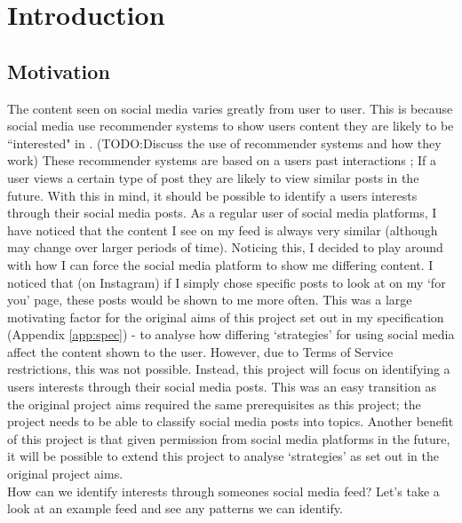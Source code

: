 \chapter{Introduction}
\label{ch:introduction}

\section{Motivation}

The content seen on social media varies greatly from user to user. This is because social media use recommender systems to
show users content they are likely to be ``interested" in \cite{}. (TODO:Discuss the use of recommender systems and how they work)
These recommender systems are based on a users past interactions \cite{};
If a user views a certain type of post they are likely to view similar posts in the future. With this in mind, it should be possible
to identify a users interests through their social media posts. As a regular user of social media platforms, I have noticed that
the content I see on my feed is always very similar (although may change over larger periods of time). Noticing this, I decided to
play around with how I can force the social media platform to show me differing content. I noticed that (on Instagram) if I simply
chose specific posts to look at on my `for you' page, these posts would be shown to me more often. This was a large motivating factor
for the original aims of this project set out in my specification (Appendix \ref{app:spec}) - to analyse how differing
`strategies' for using social media affect the content shown to the user. However, due to Terms of Service restrictions, this was not
possible. Instead, this project will focus on identifying a users interests through their social media posts. This was an easy transition
as the original project aims required the same prerequisites as this project; the project needs to be able to classify social media posts
into topics. Another benefit of this project is that given permission from social media platforms in the future, it will be possible to
extend this project to analyse `strategies' as set out in the original project aims.\\
How can we identify interests through someones social media feed? Let's take a look at an example feed and see any patterns we can
identify.
